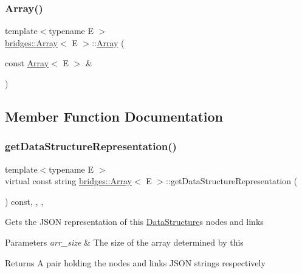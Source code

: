 \subsubsection{\texorpdfstring{Array()}{Array()}\hspace{0.1cm}{\footnotesize\ttfamily [6/6]}}
{\footnotesize\ttfamily template$<$typename E $>$ \\
\mbox{\hyperlink{classbridges_1_1_array}{bridges\+::\+Array}}$<$ E $>$\+::\mbox{\hyperlink{classbridges_1_1_array}{Array}} (\begin{DoxyParamCaption}\item[{const \mbox{\hyperlink{classbridges_1_1_array}{Array}}$<$ E $>$ \&}]{ }\end{DoxyParamCaption})\hspace{0.3cm}{\ttfamily [delete]}}



\subsection{Member Function Documentation}
\mbox{\label{classbridges_1_1_array_a12fe4db83918741620574b9c07fa62b0}} 
\subsubsection{\texorpdfstring{get\+Data\+Structure\+Representation()}{getDataStructureRepresentation()}}
{\footnotesize\ttfamily template$<$typename E $>$ \\
virtual const string \mbox{\hyperlink{classbridges_1_1_array}{bridges\+::\+Array}}$<$ E $>$\+::get\+Data\+Structure\+Representation (\begin{DoxyParamCaption}{ }\end{DoxyParamCaption}) const\hspace{0.3cm}{\ttfamily [inline]}, {\ttfamily [final]}, {\ttfamily [override]}, {\ttfamily [virtual]}}

Gets the J\+S\+ON representation of this \mbox{\hyperlink{classbridges_1_1_data_structure}{Data\+Structure}}\textquotesingle{}s nodes and links


\begin{DoxyParams}{Parameters}
{\em arr\+\_\+size} & The size of the array determined by this \\
\hline
\end{DoxyParams}
\begin{DoxyReturn}{Returns}
A pair holding the nodes and links J\+S\+ON strings respectively 
\end{DoxyReturn}


